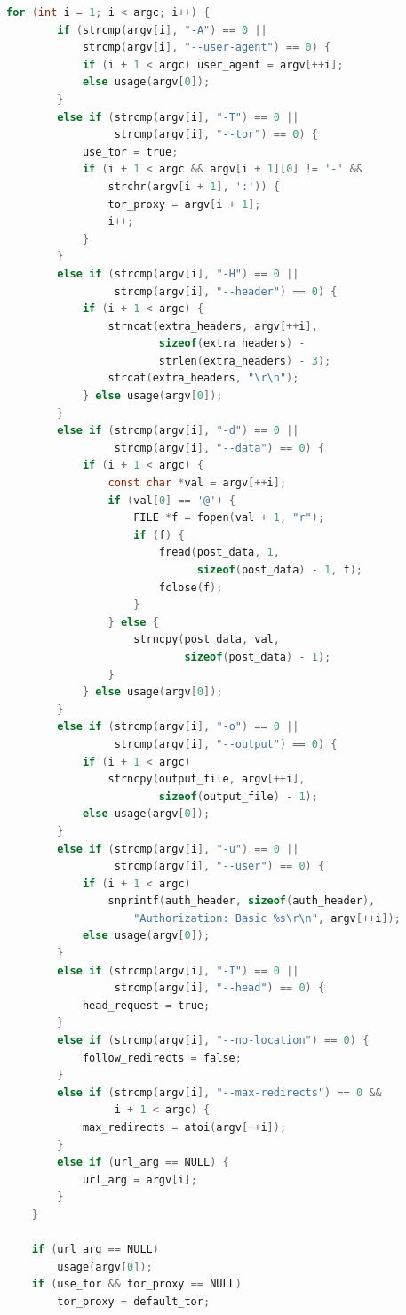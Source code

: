 \begin{lstlisting}[style=oldcode,language=C,firstnumber=last]
    for (int i = 1; i < argc; i++) {
        if (strcmp(argv[i], "-A") == 0 ||
            strcmp(argv[i], "--user-agent") == 0) {
            if (i + 1 < argc) user_agent = argv[++i];
            else usage(argv[0]);
        }
        else if (strcmp(argv[i], "-T") == 0 ||
                 strcmp(argv[i], "--tor") == 0) {
            use_tor = true;
            if (i + 1 < argc && argv[i + 1][0] != '-' &&
                strchr(argv[i + 1], ':')) {
                tor_proxy = argv[i + 1];
                i++;
            }
        }
        else if (strcmp(argv[i], "-H") == 0 ||
                 strcmp(argv[i], "--header") == 0) {
            if (i + 1 < argc) {
                strncat(extra_headers, argv[++i],
                        sizeof(extra_headers) -
                        strlen(extra_headers) - 3);
                strcat(extra_headers, "\r\n");
            } else usage(argv[0]);
        }
        else if (strcmp(argv[i], "-d") == 0 ||
                 strcmp(argv[i], "--data") == 0) {
            if (i + 1 < argc) {
                const char *val = argv[++i];
                if (val[0] == '@') {
                    FILE *f = fopen(val + 1, "r");
                    if (f) {
                        fread(post_data, 1,
                              sizeof(post_data) - 1, f);
                        fclose(f);
                    }
                } else {
                    strncpy(post_data, val,
                            sizeof(post_data) - 1);
                }
            } else usage(argv[0]);
        }
        else if (strcmp(argv[i], "-o") == 0 ||
                 strcmp(argv[i], "--output") == 0) {
            if (i + 1 < argc)
                strncpy(output_file, argv[++i],
                        sizeof(output_file) - 1);
            else usage(argv[0]);
        }
        else if (strcmp(argv[i], "-u") == 0 ||
                 strcmp(argv[i], "--user") == 0) {
            if (i + 1 < argc)
                snprintf(auth_header, sizeof(auth_header),
                    "Authorization: Basic %s\r\n", argv[++i]);
            else usage(argv[0]);
        }
        else if (strcmp(argv[i], "-I") == 0 ||
                 strcmp(argv[i], "--head") == 0) {
            head_request = true;
        }
        else if (strcmp(argv[i], "--no-location") == 0) {
            follow_redirects = false;
        }
        else if (strcmp(argv[i], "--max-redirects") == 0 &&
                 i + 1 < argc) {
            max_redirects = atoi(argv[++i]);
        }
        else if (url_arg == NULL) {
            url_arg = argv[i];
        }
    }

    if (url_arg == NULL)
        usage(argv[0]);
    if (use_tor && tor_proxy == NULL)
        tor_proxy = default_tor;
\end{lstlisting}
